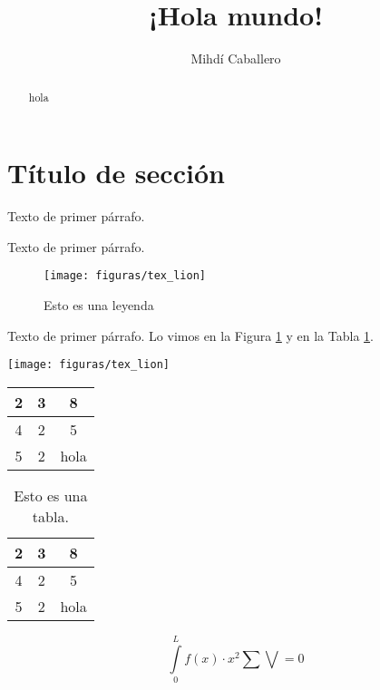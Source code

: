 \documentclass[11pt,a4paper]{article}
\title{¡Hola mundo!}
\author{Mihdí Caballero}
\begin{document}
\maketitle

\begin{abstract}
hola
\end{abstract}

\section{Título de sección}
Texto de primer párrafo.

\newpage 
Texto de primer párrafo.
\begin{figure}[h]
	\centering
	\texttt{[image: figuras/tex\_lion]}
	\caption{Esto es una leyenda}
	\label{fig:texlion}
\end{figure}

Texto de primer párrafo. Lo vimos en la Figura \ref{fig:texlion} y en la Tabla \ref{tab:datos}.

\texttt{[image: figuras/tex\_lion]}

\begin{tabular}{|c|c|c|}
	\hline
	2 & 3 & 8 \\
	\hline
	4 & 2 & 5 \\
	\hline
	5 & 2 & hola \\
	\hline
\end{tabular}

\begin{table}[h]
	\centering
	\begin{tabular}{|c|c|c|}
		\hline
		2 & 3 & 8 \\
		\hline
		4 & 2 & 5 \\
		\hline
		5 & 2 & hola \\
		\hline
	\end{tabular}
	\caption{Esto es una tabla.}
	\label{tab:datos}
\end{table}

$$\underset{0}{\overset{L}{\int }}f\left(x\right)\cdot {x}^{2}\sum \bigvee=0$$
\end{document}
